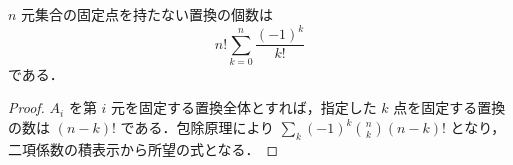 \begin{prop}[完全順列]
$n$ 元集合の固定点を持たない置換の個数は
\[
n!\sum_{k=0}^n\frac{(-1)^k}{k!}
\]
である．
\end{prop}
\begin{proof}
$A_i$ を第 $i$ 元を固定する置換全体とすれば，指定した $k$ 点を固定する置換の数は $(n-k)!$ である．包除原理により $\sum_k(-1)^k\binom nk(n-k)!$ となり，二項係数の積表示から所望の式となる．
\end{proof}
